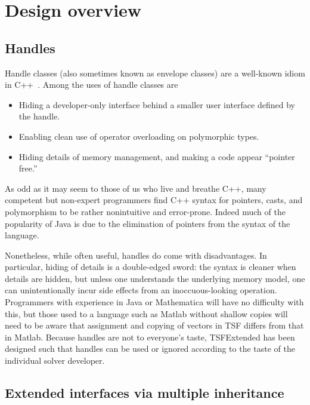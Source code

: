 
\section{Design overview}

\subsection{Handles}

Handle classes
(also sometimes known as envelope classes) 
are a well-known idiom in C++~\cite{ref:advanced_c++_coplien}. 
Among the uses of handle classes are
\begin{itemize}
\item Hiding a developer-only interface behind a smaller user interface
defined by the handle.
\item Enabling clean use of operator overloading on polymorphic types.
\item Hiding details of memory management, and making a code appear
``pointer free.''
\end{itemize}

As odd as it may seem to those of us who live and breathe C++, 
many competent but non-expert
programmers find C++ syntax for pointers, casts, and polymorphism
to be rather nonintuitive and error-prone. Indeed 
much of the popularity of Java is due to the elimination
of pointers from the syntax of the language.  

Nonetheless, while often useful, handles do come with disadvantages. 
In particular, hiding of details is a double-edged sword: the syntax
is cleaner when details are hidden, but unless one understands the 
underlying memory model, one can unintentionally incur side effects
from an inoccuous-looking operation. Programmers with experience in Java
or Mathematica will have no difficulty with this, but those used to a
language such as Matlab without shallow copies will need to be aware that 
assignment and copying of vectors in TSF differs from that in Matlab.
Because handles are not to everyone's taste, TSFExtended has been designed 
such that handles can be used or ignored according to the
taste of the individual solver developer.




\subsection{Extended interfaces via multiple inheritance}

